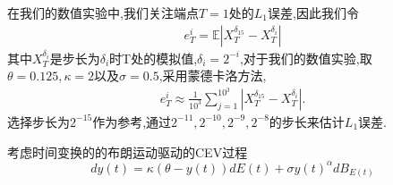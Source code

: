 在我们的数值实验中,我们关注端点$T = 1$处的$L_1$误差,因此我们令
\begin{align*}
	e_T^{i}=\mathbb{E}\left|X_T^{\delta _{15}}-X_T^{\delta _i}\right|
\end{align*}
其中$X_T^{\delta _i}$是步长为$\delta _i$时T处的模拟值,$\delta _i = 2^{-i}$,对于我们的数值实验,取$\theta=0.125,\kappa=2$以及$\sigma=0.5$,采用蒙德卡洛方法,
\begin{align*}
	e_{T}^i\approx\frac{1}{10^3}\sum_{j=1}^{10^3}\left|X_T^{\delta _{15}}-X_T^{\delta _i}\right|.
\end{align*}
选择步长为$2^{-15}$作为参考,通过${2^{-11},2^{-10},2^{-9},2^{-8}}$的步长来估计$L_1$误差.

\begin{example}
	考虑时间变换的的布朗运动驱动的CEV过程
    \begin{equation}\label{CEV}
    	dy(t)=\kappa(\theta-y(t))dE(t)+\sigma y(t)^\alpha dB_{E(t)}
    \end{equation}
\end{example}

